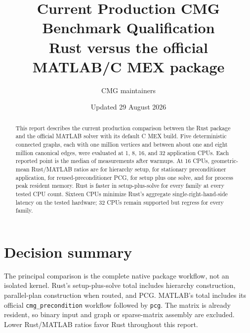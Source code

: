 \documentclass[10pt]{article}
\title{Current Production CMG Benchmark Qualification\\
\large Rust versus the official MATLAB/C MEX package}
\author{CMG maintainers}
\date{Updated 29 August 2026}
\begin{document}
\maketitle

\begin{abstract}
This report describes the current production comparison between the Rust package and the official MATLAB solver with its default C MEX build.  Five deterministic connected graphs, each with one million vertices and between about one and eight million canonical edges, were evaluated at 1, 8, 16, and 32 application CPUs.  Each reported point is the median of \ReportRepetitions{} measurements after \ReportWarmups{} warmups.  At 16 CPUs, geometric-mean Rust/MATLAB ratios are \ReportSixteenSetupRatio{} for hierarchy setup, \ReportSixteenApplyRatio{} for stationary preconditioner application, \ReportSixteenPcgRatio{} for reused-preconditioner PCG, \ReportSixteenTotalRatio{} for setup plus one solve, and \ReportSixteenRssRatio{} for process peak resident memory.  Rust is faster in setup-plus-solve for every family at every tested CPU count.  Sixteen CPUs minimize Rust's aggregate single-right-hand-side latency on the tested hardware; 32 CPUs remain supported but regress for every family.
\end{abstract}

\section{Decision summary}

\noindent{}

The principal comparison is the complete native package workflow, not an isolated kernel.  Rust's setup-plus-solve total includes hierarchy construction, parallel-plan construction when routed, and PCG.  MATLAB's total includes its official \texttt{cmg\_precondition} workflow followed by \texttt{pcg}.  The matrix is already resident, so binary input and graph or sparse-matrix assembly are excluded.  Lower Rust/MATLAB ratios favor Rust throughout this report.
\end{document}
